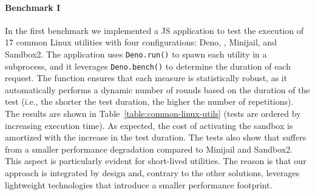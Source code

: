 \paragraph{Benchmark I}
%
In the first benchmark we implemented a JS application to test the
execution of 17 common Linux utilities with
four configurations: Deno, \pap, Minijail, and Sandbox2. The
application uses {\tt Deno.run()} to spawn each utility in a
subprocess, and it leverages {\tt Deno.bench()} to determine the duration of each request. The
function ensures that each measure is statistically robust, as it
automatically performs a dynamic number of rounds based on the
duration of the test (i.e., the shorter the test duration, the higher
the number of repetitions). The results are shown in
Table~\ref{table:common-linux-utils} (tests are ordered by increasing
execution time). As expected, the cost of activating the sandbox is
amortized with the increase in the test duration. The tests also show
that \pap suffers from a smaller performance degradation compared to
Minijail and Sandbox2. This aspect is particularly evident for
short-lived utilities. The reason is that our approach is integrated
by design and, contrary to the other solutions, leverages lightweight
technologies that introduce a smaller performance footprint.

